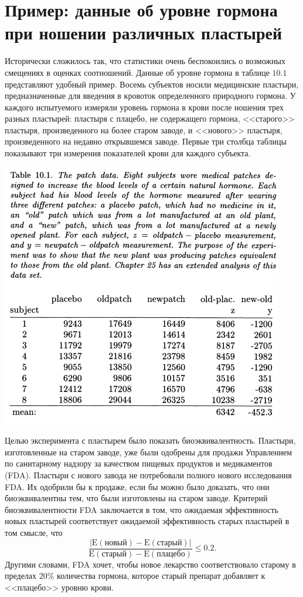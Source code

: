 \section{Пример: данные об уровне гормона при ношении различных пластырей}

Исторически сложилось так, что статистики очень беспокоились о возможных смещениях в оценках соотношений. Данные об уровне гормона в таблице $10.1$ представляют удобный пример. Восемь субъектов носили медицинские пластыри, предназначенные для введения в кровоток определенного природного гормона. У каждого испытуемого измеряли уровень гормона в крови после ношения трех разных пластырей: пластыря с плацебо, не содержащего гормона, <<старого>> пластыря, произведенного на более старом заводе, и <<нового>> пластыря, произведенного на недавно открывшемся заводе. Первые три столбца таблицы показывают три измерения показателей крови для каждого субъекта.

\noindent
\includegraphics[width=\linewidth]{10/t10.1.png}
\newline

Целью эксперимента с пластырем было показать биоэквивалентность. Пластыри, изготовленные на старом заводе, уже были одобрены для продажи Управлением по санитарному надзору за качеством пищевых продуктов и медикаментов (FDA). Пластыри с нового завода не потребовали полного нового исследования FDA. Их одобрили бы к продаже, если бы можно было доказать, что они биоэквивалентны тем, что были изготовлены на старом заводе. Критерий биоэквивалентности FDA заключается в том, что ожидаемая эффективность новых пластырей соответствует ожидаемой эффективность старых пластырей в том смысле, что
\begin{equation}\label{eq10.5}
    \frac{\left|\mathrm{E}(\text{новый}) - \mathrm{E}(\text{старый})\right|}{\mathrm{E}(\text{старый}) - \mathrm{E}(\text{плацебо})} \leq 0.2.
\end{equation}
Другими словами, FDA хочет, чтобы новое лекарство соответствовало старому в пределах $20\%$ количества гормона, которое старый препарат добавляет к <<плацебо>> уровню крови.

